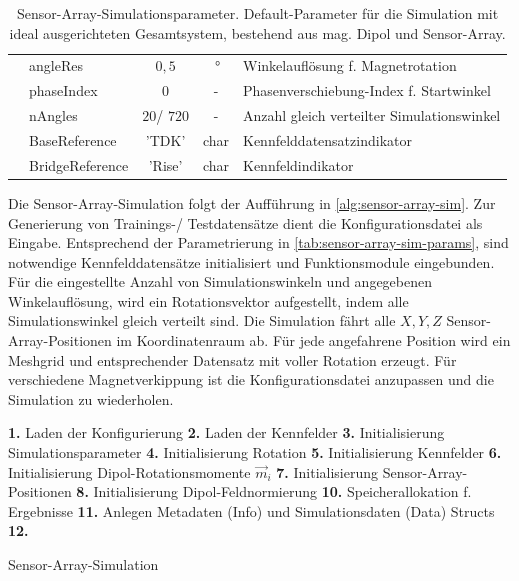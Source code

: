 \begin{table}[!htbp]
{\begin{tabular}{l l c c l}
												 & angleRes 		  & $0,5$ 			   & $\SI{}{\degree}$ 				 & Winkelauflösung f. Magnetrotation \\
												 & phaseIndex 		  & 0 				   & - 								 & Phasenverschiebung-Index f. Startwinkel\\
												 & nAngles 			  & $20$/ $720$ 	   & -  							 & Anzahl gleich verteilter Simulationswinkel \\
												 & BaseReference 	  & 'TDK' 			   & char 							 & Kennfelddatensatzindikator \\
												 & BridgeReference 	  & 'Rise' 			   & char 							 & Kennfeldindikator \\
		\bottomrule		
	\end{tabular}}
	\caption[Sensor-Array-Simulationsparameter]{Sensor-Array-Simulationsparameter. Default-Parameter für die Simulation mit ideal ausgerichteten Gesamtsystem, bestehend aus mag. Dipol und Sensor-Array.}
	\label{tab:sensor-array-sim-params}
\end{table}


\clearpage


Die Sensor-Array-Simulation folgt der Aufführung in \autoref{alg:sensor-array-sim}. Zur Generierung von Trainings-/ Testdatensätze dient die Konfigurationsdatei als Eingabe. Entsprechend der Parametrierung in \autoref{tab:sensor-array-sim-params}, sind notwendige Kennfelddatensätze initialisiert und Funktionsmodule eingebunden. Für die eingestellte Anzahl von Simulationswinkeln und angegebenen Winkelauflösung, wird ein Rotationsvektor aufgestellt, indem alle Simulationswinkel gleich verteilt sind. Die Simulation fährt alle $X,Y,Z$ Sensor-Array-Positionen im Koordinatenraum ab. Für jede angefahrene Position wird ein Meshgrid und entsprechender Datensatz mit voller Rotation erzeugt. Für verschiedene Magnetverkippung ist die Konfigurationsdatei anzupassen und die Simulation zu wiederholen.


\begin{algorithm}
	\SetAlgoLined
	\textbf{1.} Laden der Konfigurierung\;
	\textbf{2.} Laden der Kennfelder\;
	\textbf{3.} Initialisierung Simulationsparameter\;
	\textbf{4.} Initialisierung Rotation\;
	\textbf{5.} Initialisierung Kennfelder\;
	\textbf{6.} Initialisierung Dipol-Rotationsmomente $\vec{m}_i$\;
	\textbf{7.} Initialisierung Sensor-Array-Positionen\;
	\textbf{8.} Initialisierung Dipol-Feldnormierung\;
	\textbf{10.} Speicherallokation f. Ergebnisse\;
	\textbf{11.} Anlegen Metadaten (Info) und Simulationsdaten (Data) Structs\;
	\textbf{12.} 
	\caption{Sensor-Array-Simulation}
	\label{alg:sensor-array-sim}
\end{algorithm}



